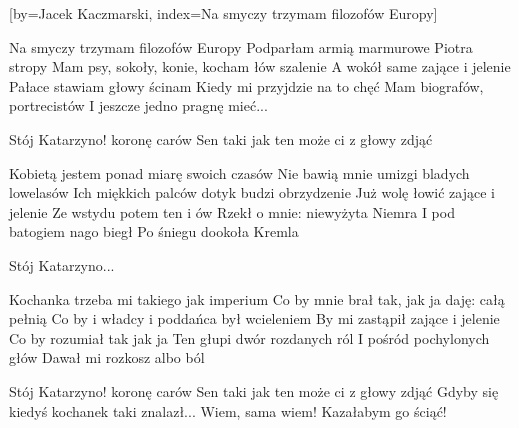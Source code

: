 [by={Jacek Kaczmarski},
                     index={Na smyczy trzymam filozofów Europy}]
\beginverse

Na smyczy trzymam filozofów Europy
Podparłam armią marmurowe Piotra stropy
Mam psy, sokoły, konie, kocham łów szalenie
A wokół same zające i jelenie
Pałace stawiam głowy ścinam
Kiedy mi przyjdzie na to chęć
Mam biografów, portrecistów
I jeszcze jedno pragnę mieć...

\endverse

\beginverse

Stój Katarzyno! koronę carów
Sen taki jak ten może ci z głowy zdjąć

\endverse

\beginverse

Kobietą jestem ponad miarę swoich czasów
Nie bawią mnie umizgi bladych lowelasów
Ich miękkich palców dotyk budzi obrzydzenie
Już wolę łowić zające i jelenie
Ze wstydu potem ten i ów
Rzekł o mnie: niewyżyta Niemra
I pod batogiem nago biegł
Po śniegu dookoła Kremla

\endverse

\beginverse

Stój Katarzyno...

\endverse

\beginverse

Kochanka trzeba mi takiego jak imperium
Co by mnie brał tak, jak ja daję: całą pełnią
Co by i władcy i poddańca był wcieleniem
By mi zastąpił zające i jelenie
Co by rozumiał tak jak ja
Ten głupi dwór rozdanych ról
I pośród pochylonych głów
Dawał mi rozkosz albo ból

\endverse

\beginverse

Stój Katarzyno! koronę carów
Sen taki jak ten może ci z głowy zdjąć
Gdyby się kiedyś kochanek taki znalazł...
Wiem, sama wiem! Kazałabym go ściąć!

\endverse

\endsong